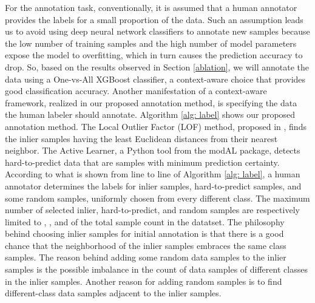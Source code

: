 \documentclass{article}
\begin{document}
For the annotation task, conventionally, it is assumed that a human annotator provides the labels for a small proportion of the data. Such an assumption leads us to avoid using deep neural network classifiers to annotate new samples because the low number of training samples and the high number of model parameters expose the model to overfitting, which in turn causes the prediction accuracy to drop. So, based on the results observed in Section \ref{ablation}, we will annotate the data using a One-vs-All XGBoost classifier, a context-aware choice that provides good classification accuracy. Another manifestation of a context-aware framework, realized in our proposed annotation method, is specifying the data the human labeler should annotate. Algorithm \ref{alg: label} shows our proposed annotation method. The Local Outlier Factor (LOF) method, proposed in \citep{Breunig}, finds the inlier samples having the least Euclidean distances from their nearest neighbor. The Active Learner, a Python tool from the modAL package, detects hard-to-predict data that are samples with minimum prediction certainty. According to what is shown from line  to line  of Algorithm \ref{alg: label}, a human annotator determines the labels for inlier samples, hard-to-predict samples, and some random samples, uniformly chosen from every different class. The maximum number of selected inlier, hard-to-predict, and random samples are respectively limited to , , and  of the total sample count in the datatset. The philosophy behind choosing inlier samples for initial annotation is that there is a good chance that the neighborhood of the inlier samples embraces the same class samples. The reason behind adding some random data samples to the inlier samples is the possible imbalance in the count of data samples of different classes in the inlier samples. Another reason for adding random samples is to find different-class data samples adjacent to the inlier samples. 
\end{document}
